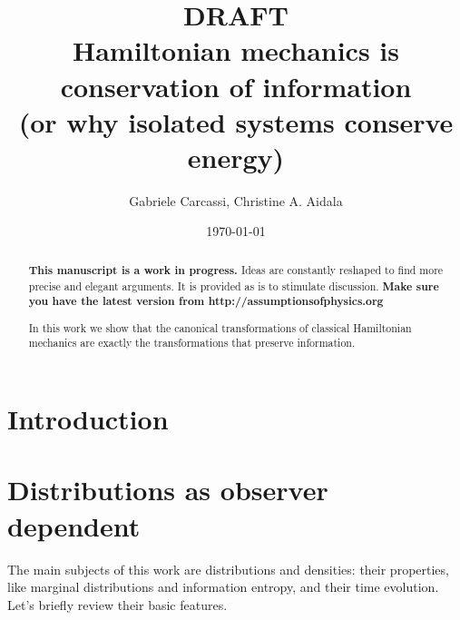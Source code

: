 \documentclass[smallextended]{svjour3}
\numberwithin{equation}{section}
\theoremstyle{definition}
\newcommand{\journal}[1]{\ifjournal#1\fi}
\newcommand{\arxiv}[1]{\ifjournal\else#1\fi}
\begin{document}
\title{DRAFT \\ Hamiltonian mechanics is conservation of information \\ (or why isolated systems conserve energy)}
\author{Gabriele Carcassi, Christine A. Aidala}

\ifjournal
\else
\fi


\date{\today}

\journal{\maketitle}
	
\begin{abstract}
\textbf{This manuscript is a work in progress.} Ideas are constantly reshaped to find more precise and elegant arguments. It is provided as is to stimulate discussion.  \textbf{Make sure you have the latest version from http://assumptionsofphysics.org}

In this work we show that the canonical transformations of classical Hamiltonian mechanics are exactly the transformations that preserve information.
\end{abstract}

\arxiv{\maketitle}

\section{Introduction}

\section{Distributions as observer dependent}

The main subjects of this work are distributions and densities: their properties, like marginal distributions and information entropy, and their time evolution. Let's briefly review their basic features.
\end{document}
